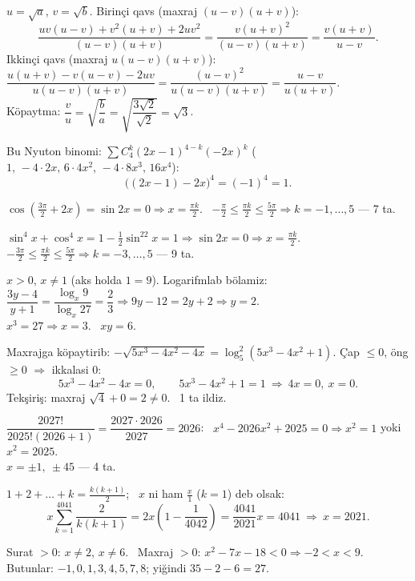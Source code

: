 $u=\sqrt a$, $v=\sqrt b$. Birinçi qavs (maxraj $(u-v)(u+v)$):
\[\frac{uv(u-v)+v^2(u+v)+2uv^2}{(u-v)(u+v)}=\frac{v(u+v)^2}{(u-v)(u+v)}=\frac{v(u+v)}{u-v}.\]
Ikkinçi qavs (maxraj $u(u-v)(u+v)$): \ $\dfrac{u(u+v)-v(u-v)-2uv}{u(u-v)(u+v)}=\dfrac{(u-v)^2}{u(u-v)(u+v)}=\dfrac{u-v}{u(u+v)}$.\\
Köpaytma: $\dfrac vu=\sqrt{\dfrac ba}=\sqrt{\dfrac{3\sqrt2}{\sqrt2}}=\sqrt3$.

Bu Nyuton binomi: $\sum C_4^k(2x-1)^{4-k}(-2x)^k$ ($1,\,-4\cdot2x,\,6\cdot4x^2,\,-4\cdot8x^3,\,16x^4$):
\[\bigl((2x-1)-2x\bigr)^4=(-1)^4=1.\]

$\cos\left(\frac{3\pi}2+2x\right)=\sin2x=0\Rightarrow x=\frac{\pi k}2$. \ $-\frac\pi2\le\frac{\pi k}2\le\frac{5\pi}2\Rightarrow k=-1,\dots,5$ — 7 ta.

$\sin^4x+\cos^4x=1-\frac12\sin^22x=1\Rightarrow\sin2x=0\Rightarrow x=\frac{\pi k}2$.\\
$-\frac{3\pi}2\le\frac{\pi k}2\le\frac{5\pi}2\Rightarrow k=-3,\dots,5$ — 9 ta.

$x>0$, $x\ne1$ (aks holda $1=9$). Logarifmlab bölamiz: $\dfrac{3y-4}{y+1}=\dfrac{\log_x9}{\log_x27}=\dfrac23\Rightarrow9y-12=2y+2\Rightarrow y=2$.\\
$x^3=27\Rightarrow x=3$. \ $xy=6$.

Maxrajga köpaytirib: $-\sqrt{5x^3-4x^2-4x}=\log_5^2(5x^3-4x^2+1)$. Çap $\le0$, öng $\ge0$ $\Rightarrow$ ikkalasi 0:
\[5x^3-4x^2-4x=0,\qquad5x^3-4x^2+1=1\ \Rightarrow\ 4x=0,\ x=0.\]
Tekşiriş: maxraj $\sqrt4+0=2\ne0$. \ 1 ta ildiz.

$\dfrac{2027!}{2025!(2026+1)}=\dfrac{2027\cdot2026}{2027}=2026$: \ $x^4-2026x^2+2025=0\Rightarrow x^2=1$ yoki $x^2=2025$.\\
$x=\pm1,\ \pm45$ — 4 ta.

$1+2+\dots+k=\frac{k(k+1)}2$; \ $x$ ni ham $\frac x1$ ($k=1$) deb olsak:
\[x\sum_{k=1}^{4041}\frac2{k(k+1)}=2x\left(1-\frac1{4042}\right)=\frac{4041}{2021}x=4041\ \Rightarrow\ x=2021.\]

Surat $>0$: $x\ne2$, $x\ne6$. \ Maxraj $>0$: $x^2-7x-18<0\Rightarrow-2<x<9$.\\
Butunlar: $-1,0,1,3,4,5,7,8$; yiğindi $35-2-6=27$.


